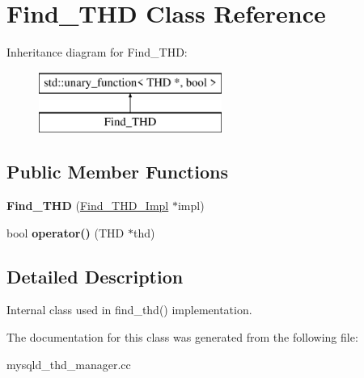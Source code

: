 \hypertarget{classFind__THD}{}\section{Find\+\_\+\+T\+HD Class Reference}
\label{classFind__THD}
Inheritance diagram for Find\+\_\+\+T\+HD\+:\begin{figure}[H]
\begin{center}
\leavevmode
\includegraphics[height=2.000000cm]{classFind__THD}
\end{center}
\end{figure}
\subsection*{Public Member Functions}
\begin{DoxyCompactItemize}
\item 
\mbox{\label{classFind__THD_a5ce3d1da1577912e8e1b29e653cd890d}} 
{\bfseries Find\+\_\+\+T\+HD} (\mbox{\hyperlink{classFind__THD__Impl}{Find\+\_\+\+T\+H\+D\+\_\+\+Impl}} $\ast$impl)
\item 
\mbox{\label{classFind__THD_a34acfdea8d1437afb8061806d466bab7}} 
bool {\bfseries operator()} (T\+HD $\ast$thd)
\end{DoxyCompactItemize}


\subsection{Detailed Description}
Internal class used in find\+\_\+thd() implementation. 

The documentation for this class was generated from the following file\+:\begin{DoxyCompactItemize}
\item 
mysqld\+\_\+thd\+\_\+manager.\+cc\end{DoxyCompactItemize}
